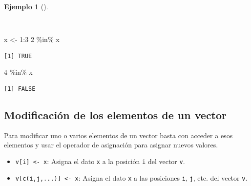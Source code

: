 \documentclass[
  spanish,
  a4paper,
]{scrreport}
\newenvironment{Shaded}{\begin{snugshade}}{\end{snugshade}}
\newcommand{\DecValTok}[1]{\textcolor[rgb]{0.68,0.00,0.00}{#1}}
\newcommand{\NormalTok}[1]{\textcolor[rgb]{0.00,0.23,0.31}{#1}}
\newcommand{\OtherTok}[1]{\textcolor[rgb]{0.00,0.23,0.31}{#1}}
\newcommand{\SpecialCharTok}[1]{\textcolor[rgb]{0.37,0.37,0.37}{#1}}
\providecommand{\tightlist}{%
  \setlength{\itemsep}{0pt}\setlength{\parskip}{0pt}}
\theoremstyle{definition}
\theoremstyle{definition}
\newtheorem{example}{Ejemplo}[chapter]
\theoremstyle{remark}
\begin{document}
\begin{example}[]\protect\hypertarget{exm-pertenencia-vector}{}\label{exm-pertenencia-vector}

~

\begin{Shaded}
\begin{Highlighting}[]
\NormalTok{x }\OtherTok{\textless{}{-}} \DecValTok{1}\SpecialCharTok{:}\DecValTok{3}
\DecValTok{2} \SpecialCharTok{\%in\%}\NormalTok{ x}
\end{Highlighting}
\end{Shaded}

\begin{verbatim}
[1] TRUE
\end{verbatim}

\begin{Shaded}
\begin{Highlighting}[]
\DecValTok{4} \SpecialCharTok{\%in\%}\NormalTok{ x}
\end{Highlighting}
\end{Shaded}

\begin{verbatim}
[1] FALSE
\end{verbatim}

\end{example}

\subsection{Modificación de los elementos de un
vector}\label{modificaciuxf3n-de-los-elementos-de-un-vector}

Para modificar uno o varios elementos de un vector basta con acceder a
esos elementos y usar el operador de asignación para asignar nuevos
valores.

\begin{itemize}
\tightlist
\item
  \texttt{v{[}i{]}\ \textless{}-\ x}: Asigna el dato \texttt{x} a la
  posición \texttt{i} del vector \texttt{v}.
\item
  \texttt{v{[}c(i,j,...){]}\ \textless{}-\ x}: Asigna el dato \texttt{x}
  a las posiciones \texttt{i}, \texttt{j}, etc. del vector \texttt{v}.
\end{itemize}
\end{document}
